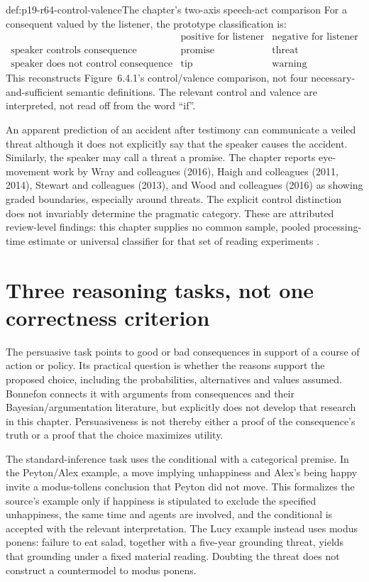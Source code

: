 \begin{hbconvention}{def:p19-r64-control-valence}{The chapter's two-axis speech-act comparison}
For a consequent valued by the listener, the prototype classification is:
\[
\begin{array}{c|cc}
 &\text{positive for listener}&\text{negative for listener}\\\hline
 \text{speaker controls consequence}&\text{promise}&\text{threat}\\
 \text{speaker does not control consequence}&\text{tip}&\text{warning}
\end{array}
\]
This reconstructs Figure~6.4.1's control/valence comparison, not four
necessary-and-sufficient semantic definitions. The relevant control and
valence are interpreted, not read off from the word ``if''.
\end{hbconvention}

An apparent prediction of an accident after testimony can communicate a
veiled threat although it does not explicitly say that the speaker causes
the accident. Similarly, the speaker may call a threat a promise. The chapter
reports eye-movement work by Wray and colleagues (2016), Haigh and colleagues
(2011, 2014), Stewart and colleagues (2013), and Wood and colleagues (2016)
as showing graded boundaries, especially around threats. The explicit
control distinction does not invariably determine the pragmatic category.
These are attributed review-level findings: this chapter supplies no common
sample, pooled processing-time estimate or universal classifier for that
set of reading experiments \cite[pp.~419--420]{Bonnefon2021Utility}.

\section{Three reasoning tasks, not one correctness criterion}
\label{sec:p19-r64-tasks}

The persuasive task points to good or bad consequences in support of a
course of action or policy. Its practical question is whether the reasons
support the proposed choice, including the probabilities, alternatives and
values assumed. Bonnefon connects it with arguments from consequences and
their Bayesian/argumentation literature, but explicitly does not develop that
research in this chapter. Persuasiveness is not thereby either a proof of
the consequence's truth or a proof that the choice maximizes utility.

The standard-inference task uses the conditional with a categorical premise.
In the Peyton/Alex example, a move implying unhappiness and Alex's being happy
invite a modus-tollens conclusion that Peyton did not move. This formalizes
the source's example only if happiness is stipulated to exclude the specified
unhappiness, the same time and agents are involved, and the conditional is
accepted with the relevant interpretation. The Lucy example instead uses
modus ponens: failure to eat salad, together with a five-year grounding
threat, yields that grounding under a fixed material reading. Doubting the
threat does not construct a countermodel to modus ponens.

